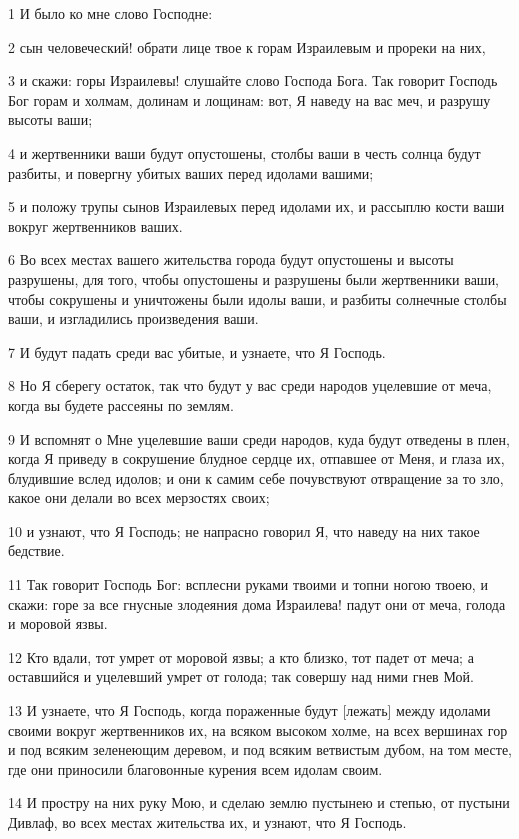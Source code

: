 \par 1 И было ко мне слово Господне:
\par 2 сын человеческий! обрати лице твое к горам Израилевым и прореки на них,
\par 3 и скажи: горы Израилевы! слушайте слово Господа Бога. Так говорит Господь Бог горам и холмам, долинам и лощинам: вот, Я наведу на вас меч, и разрушу высоты ваши;
\par 4 и жертвенники ваши будут опустошены, столбы ваши в честь солнца будут разбиты, и повергну убитых ваших перед идолами вашими;
\par 5 и положу трупы сынов Израилевых перед идолами их, и рассыплю кости ваши вокруг жертвенников ваших.
\par 6 Во всех местах вашего жительства города будут опустошены и высоты разрушены, для того, чтобы опустошены и разрушены были жертвенники ваши, чтобы сокрушены и уничтожены были идолы ваши, и разбиты солнечные столбы ваши, и изгладились произведения ваши.
\par 7 И будут падать среди вас убитые, и узнаете, что Я Господь.
\par 8 Но Я сберегу остаток, так что будут у вас среди народов уцелевшие от меча, когда вы будете рассеяны по землям.
\par 9 И вспомнят о Мне уцелевшие ваши среди народов, куда будут отведены в плен, когда Я приведу в сокрушение блудное сердце их, отпавшее от Меня, и глаза их, блудившие вслед идолов; и они к самим себе почувствуют отвращение за то зло, какое они делали во всех мерзостях своих;
\par 10 и узнают, что Я Господь; не напрасно говорил Я, что наведу на них такое бедствие.
\par 11 Так говорит Господь Бог: всплесни руками твоими и топни ногою твоею, и скажи: горе за все гнусные злодеяния дома Израилева! падут они от меча, голода и моровой язвы.
\par 12 Кто вдали, тот умрет от моровой язвы; а кто близко, тот падет от меча; а оставшийся и уцелевший умрет от голода; так совершу над ними гнев Мой.
\par 13 И узнаете, что Я Господь, когда пораженные будут [лежать] между идолами своими вокруг жертвенников их, на всяком высоком холме, на всех вершинах гор и под всяким зеленеющим деревом, и под всяким ветвистым дубом, на том месте, где они приносили благовонные курения всем идолам своим.
\par 14 И простру на них руку Мою, и сделаю землю пустынею и степью, от пустыни Дивлаф, во всех местах жительства их, и узнают, что Я Господь.

